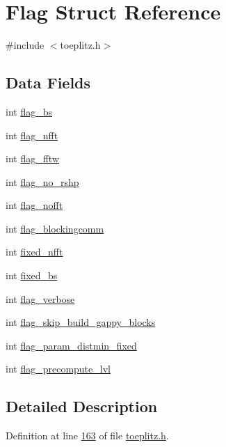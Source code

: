 \hypertarget{structFlag}{\section{Flag Struct Reference}
\label{structFlag}
}


{\ttfamily \#include $<$toeplitz.\-h$>$}

\subsection*{Data Fields}
\begin{DoxyCompactItemize}
\item 
int \hyperlink{structFlag_abeb9784f834d231864f1a722c7d79398}{flag\-\_\-bs}
\item 
int \hyperlink{structFlag_a6c22a65604c9dd03d58ecf602bb67952}{flag\-\_\-nfft}
\item 
int \hyperlink{structFlag_adf245cb515d8a26bdc70c7226d3dfb39}{flag\-\_\-fftw}
\item 
int \hyperlink{structFlag_a59bc77f2a4fd6e11947b65033c9dea25}{flag\-\_\-no\-\_\-rshp}
\item 
int \hyperlink{structFlag_ae6ae474d648b80963df05ac9bcf64e48}{flag\-\_\-nofft}
\item 
int \hyperlink{structFlag_a9a3d002dea599c154b60af540c868cb5}{flag\-\_\-blockingcomm}
\item 
int \hyperlink{structFlag_a3e8ec6d9ff8ecf0ceff5de51ca98e65b}{fixed\-\_\-nfft}
\item 
int \hyperlink{structFlag_a32e56c6cf96b69f4dd6e0f2dcdb88678}{fixed\-\_\-bs}
\item 
int \hyperlink{structFlag_a2a95d22f9f2430453cfba79d30f12f98}{flag\-\_\-verbose}
\item 
int \hyperlink{structFlag_a554392271ddce269c1f562aaecd4a17b}{flag\-\_\-skip\-\_\-build\-\_\-gappy\-\_\-blocks}
\item 
int \hyperlink{structFlag_a51e7368d87f7d743dbf7c04dde411af1}{flag\-\_\-param\-\_\-distmin\-\_\-fixed}
\item 
int \hyperlink{structFlag_a479c04f9761b9b91c55362f491df0ea1}{flag\-\_\-precompute\-\_\-lvl}
\end{DoxyCompactItemize}


\subsection{Detailed Description}


Definition at line \hyperlink{toeplitz_8h_source_l00163}{163} of file \hyperlink{toeplitz_8h_source}{toeplitz.\-h}.



